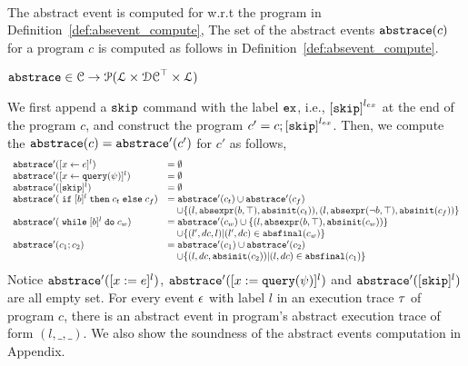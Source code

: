\\
The abstract event is computed for w.r.t the program in Definition~\ref{def:absevent_compute}, 
The set of the abstract events $\mathtt{abs}{\mathtt{trace}}(c)$ for a program $c$
is computed as follows in Definition~\ref{def:absevent_compute}.
 \begin{defn}
 \label{def:absevent_compute}
  $\mathtt{abs}{\mathtt{trace}} \in \mathcal{C} \to \mathcal{P}( \mathcal{L} \times \mathcal{DC}^{\top} \times \mathcal{L} )$
  \end{defn}
 We first append a $\mathtt{skip}$ command with 
the label $\mathtt{ex}$, i.e., $\clabel{\eskip}^{l_{ex}}$ at the end of the program $c$, and construct 
the program $c' = c;\clabel{\eskip}^{l_{ex}}$.
Then, we compute the $\mathtt{abs}{\mathtt{trace}}(c) = \mathtt{abs}{\mathtt{trace}}'(c')$ for $c'$ as follows,
 {\footnotesize
 \[
   \begin{array}{ll}
      \absflow'(\clabel{\assign{x}{\expr}}{}^l)  & = \emptyset  \\
      \absflow'(\clabel{\assign{x}{\query(\qexpr)}}{}^l)  & = \emptyset  \\
      \absflow'([\eskip]^{l})  & = \emptyset \\
      \absflow'(\eif [b]^l \ethen c_t \eelse c_f)  & =  \absflow'(c_t) \cup \absflow'(c_f)
        \\ & \quad 
        \cup \{(l, \absexpr(\bexpr, \top),  \absinit(c_t) ) ,  (l, \absexpr(\neg\bexpr, \top), \absinit(c_f)) \} \\
       \absflow'(\ewhile [b]^l \edo c_w)  & =  \absflow'(c_w) \cup \{(l, \absexpr(\bexpr, \top), \absinit(c_w)) \} 
       \\ & \quad 
       \cup \{(l', dc, l)| (l', dc) \in \absfinal(c_w) \} \\
       \absflow'(c_1 ; c_2)  & = \absflow'(c_1) \cup  \absflow'(c_2) 
       \\ & \quad 
       \cup \{ (l, dc, \absinit(c_2)) | (l, dc) \in \absfinal(c_1) \} \\
   \end{array}
   \]
   }
   Notice $\mathtt{abs}{\mathtt{trace}}'([x := e]^{l})$, $\mathtt{abs}{\mathtt{trace}}'([x := {\tt query}(\psi)]^{l})$ and $\mathtt{abs}{\mathtt{trace}}'([\mathtt{skip}]^{l})$ are all empty set. 
   For every event $\mathtt{\epsilon}$ with label $l$ in an execution trace $\mathtt{\tau}$ of program $c$, 
   there is an abstract event in program's abstract execution trace of form $(l, \_, \_)$.  
   We also show the soundness of the abstract events computation in Appendix.

